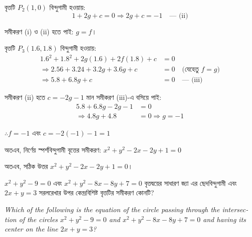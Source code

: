 \documentclass[12pt, a4paper]{article}
\begin{document}
\begin{tcolorbox}[solutionbox={সমাধান (Solution)}]
    \vspace{0.5em}
    বৃত্তটি $P_2(1, 0)$ বিন্দুগামী হওয়ায়:
    \[ 1 + 2g + c = 0 \Rightarrow 2g + c = -1 \quad \text{--- (ii)} \]
    
    \vspace{0.5em}
    সমীকরণ (i) ও (ii) হতে পাই: $g = f$।
    
    \vspace{0.5em}
    বৃত্তটি $P_3(1.6, 1.8)$ বিন্দুগামী হওয়ায়:
    \begin{align*}
        1.6^2 + 1.8^2 + 2g(1.6) + 2f(1.8) + c &= 0 \\
        \Rightarrow 2.56 + 3.24 + 3.2g + 3.6g + c &= 0 \quad \text{(যেহেতু } f = g \text{)} \\
        \Rightarrow 5.8 + 6.8g + c &= 0 \quad \text{--- (iii)}
    \end{align*}
    
    \vspace{0.5em}
    সমীকরণ (ii) হতে $c = -2g - 1$ মান সমীকরণ (iii)-এ বসিয়ে পাই:
    \begin{align*}
        5.8 + 6.8g - 2g - 1 &= 0 \\
        \Rightarrow 4.8g + 4.8 &= 0 \Rightarrow g = -1
    \end{align*}
    
    \vspace{0.5em}
    $\therefore f = -1$ এবং $c = -2(-1) - 1 = 1$
    
    \vspace{0.5em}
    অতএব, নির্ণেয় স্পর্শবিন্দুগামী বৃত্তের সমীকরণ: $x^2 + y^2 - 2x - 2y + 1 = 0$
    
    \vspace{0.5em}
    অতএব, সঠিক উত্তর $x^2 + y^2 - 2x - 2y + 1 = 0$।
\end{tcolorbox}

\vspace{2em}

\begin{tcolorbox}[questionbox={প্রশ্ন (Question) 25}]
    \noindent
    $x^2 + y^2 - 9 = 0$ এবং $x^2 + y^2 - 8x - 8y + 7 = 0$ বৃত্তদ্বয়ের সাধারণ জ্যা এর ছেদবিন্দুগামী এবং $2x + y = 3$ সরলরেখার উপর কেন্দ্রবিশিষ্ট বৃত্তটির সমীকরণ কোনটি?
    
    \vspace{0.8em}
    \begin{english}
    \noindent\textit{\color{darkgray}
    Which of the following is the equation of the circle passing through the intersection of the circles $x^2 + y^2 - 9 = 0$ and $x^2 + y^2 - 8x - 8y + 7 = 0$ and having its center on the line $2x + y = 3$?
    }
    \end{english}
\end{tcolorbox}
\end{document}
